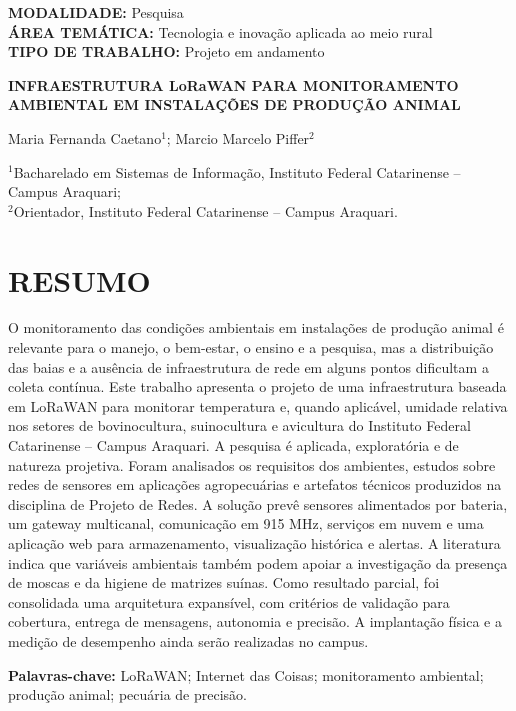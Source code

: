 \documentclass[12pt,a4paper]{article}
\begin{document}
\begin{center}
\textbf{MODALIDADE:} Pesquisa\\
\textbf{ÁREA TEMÁTICA:} Tecnologia e inovação aplicada ao meio rural\\
\textbf{TIPO DE TRABALHO:} Projeto em andamento

\vspace{0.7cm}
\textbf{INFRAESTRUTURA LoRaWAN PARA MONITORAMENTO AMBIENTAL EM INSTALAÇÕES DE PRODUÇÃO ANIMAL}

\vspace{0.2cm}
Maria Fernanda Caetano$^{1}$; Marcio Marcelo Piffer$^{2}$

\smallskip
\small $^{1}$Bacharelado em Sistemas de Informação, Instituto Federal Catarinense -- Campus Araquari;\\
$^{2}$Orientador, Instituto Federal Catarinense -- Campus Araquari.
\end{center}

\section*{RESUMO}
O monitoramento das condições ambientais em instalações de produção animal é relevante para o manejo, o bem-estar, o ensino e a pesquisa, mas a distribuição das baias e a ausência de infraestrutura de rede em alguns pontos dificultam a coleta contínua. Este trabalho apresenta o projeto de uma infraestrutura baseada em LoRaWAN para monitorar temperatura e, quando aplicável, umidade relativa nos setores de bovinocultura, suinocultura e avicultura do Instituto Federal Catarinense -- Campus Araquari. A pesquisa é aplicada, exploratória e de natureza projetiva. Foram analisados os requisitos dos ambientes, estudos sobre redes de sensores em aplicações agropecuárias e artefatos técnicos produzidos na disciplina de Projeto de Redes. A solução prevê sensores alimentados por bateria, um gateway multicanal, comunicação em 915 MHz, serviços em nuvem e uma aplicação web para armazenamento, visualização histórica e alertas. A literatura indica que variáveis ambientais também podem apoiar a investigação da presença de moscas e da higiene de matrizes suínas. Como resultado parcial, foi consolidada uma arquitetura expansível, com critérios de validação para cobertura, entrega de mensagens, autonomia e precisão. A implantação física e a medição de desempenho ainda serão realizadas no campus.

\noindent\textbf{Palavras-chave:} LoRaWAN; Internet das Coisas; monitoramento ambiental; produção animal; pecuária de precisão.
\end{document}
